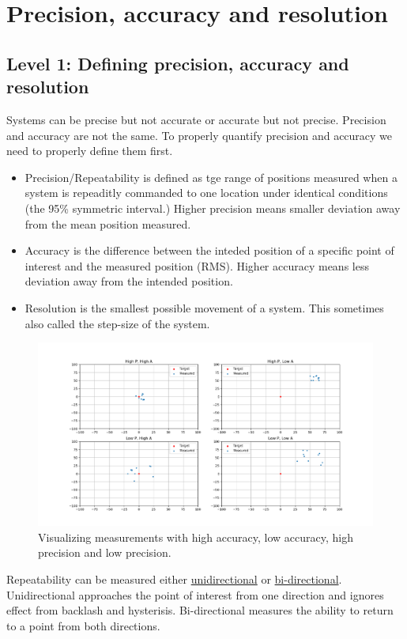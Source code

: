 \documentclass[11pt, a4paper]{article}
\begin{document}
\section{Precision, accuracy and resolution}


\subsection{Level 1: Defining precision, accuracy and resolution}
Systems can be precise but not accurate or accurate but not precise. Precision and accuracy are not the same. To properly quantify precision and accuracy we need to properly define them first.
\begin{itemize}
  \item Precision/Repeatability is defined as tge range of positions measured when a system is repeaditly commanded to one location under identical conditions (the 95\% symmetric interval.) Higher precision means smaller deviation away from the mean position measured.
  \item Accuracy is the difference between the inteded position of a specific point of interest and the measured position (RMS). Higher accuracy means less deviation away from the intended position.
  \item Resolution is the smallest possible movement of a system. This sometimes also called the step-size of the system.
\end{itemize}
\begin{figure}[h]
  \centerline{\includegraphics[width=200mm]{images/Accuracy_and_Precision.png}}
  \caption{Visualizing measurements with high accuracy, low accuracy, high precision and low precision.}
\end{figure}
Repeatability can be measured either \underline{unidirectional} or \underline{bi-directional}. Unidirectional approaches the point of interest from one direction and ignores effect from backlash and hysterisis. Bi-directional measures the ability to return to a point from both directions.
\end{document}
